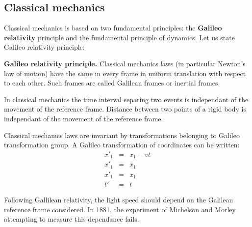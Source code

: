 \documentclass[12pt]{book}
\begin{document}
\subsection{Classical mechanics}
Classical mechanics is based on two fundamental principles: the {\bf Galileo
  relativity} principle  and the
fundamental principle of dynamics.
Let us state Galileo relativity principle:
\begin{prin}
{\bf Galileo relativity principle.}
Classical mechanics laws (in particular Newton's law of motion) have
the same in every frame in uniform translation with respect to each
other. Such frames are called Galilean frames or inertial frames.
\end{prin}
In classical mechanics the time interval separing two events is
independant of the movement of the reference frame. Distance between two
points of a rigid body is independant of the movement of the
reference frame.

\begin{rem} Classical mechanics laws are invariant by transformations
  belonging to Galileo transformation group. A Galileo transformation
of coordinates can be written:
\begin{eqnarray}
x'_1&=&x_1-vt\\
x'_1&=&x_1\\
x'_1&=&x_1\\
t'&=&t
\end{eqnarray}
\end{rem}
Following Gallilean relativity, the light speed should depend on the
Galilean reference frame considered. In 1881, the experiment of Michelson
and Morley attempting to measure this dependance fails.
\end{document}
